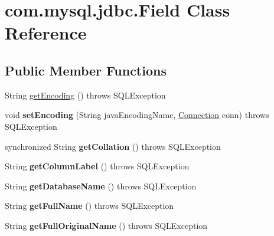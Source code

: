 \hypertarget{classcom_1_1mysql_1_1jdbc_1_1_field}{}\section{com.\+mysql.\+jdbc.\+Field Class Reference}
\label{classcom_1_1mysql_1_1jdbc_1_1_field}
\subsection*{Public Member Functions}
\begin{DoxyCompactItemize}
\item 
String \mbox{\hyperlink{classcom_1_1mysql_1_1jdbc_1_1_field_a7deff67d821ec5ec20a675db24b28c47}{get\+Encoding}} ()  throws S\+Q\+L\+Exception 
\item 
\mbox{\label{classcom_1_1mysql_1_1jdbc_1_1_field_a49216362d903e0bfc458d1fc2f1a9e19}} 
void {\bfseries set\+Encoding} (String java\+Encoding\+Name, \mbox{\hyperlink{interfacecom_1_1mysql_1_1jdbc_1_1_connection}{Connection}} conn)  throws S\+Q\+L\+Exception 
\item 
\mbox{\label{classcom_1_1mysql_1_1jdbc_1_1_field_a5f42189858633e99c1560ca3645b665c}} 
synchronized String {\bfseries get\+Collation} ()  throws S\+Q\+L\+Exception 
\item 
\mbox{\label{classcom_1_1mysql_1_1jdbc_1_1_field_aa709af1a0c07329f1079a90bca84fe3c}} 
String {\bfseries get\+Column\+Label} ()  throws S\+Q\+L\+Exception 
\item 
\mbox{\label{classcom_1_1mysql_1_1jdbc_1_1_field_a067bef1f1e01d855d33ca69e2628dda9}} 
String {\bfseries get\+Database\+Name} ()  throws S\+Q\+L\+Exception 
\item 
\mbox{\label{classcom_1_1mysql_1_1jdbc_1_1_field_a7c0e437be14611e83bf8df73447970fa}} 
String {\bfseries get\+Full\+Name} ()  throws S\+Q\+L\+Exception 
\item 
\mbox{\label{classcom_1_1mysql_1_1jdbc_1_1_field_a6f91c718000922e6c11523c6e8a52351}} 
String {\bfseries get\+Full\+Original\+Name} ()  throws S\+Q\+L\+Exception 

\end{DoxyCompactItemize}
